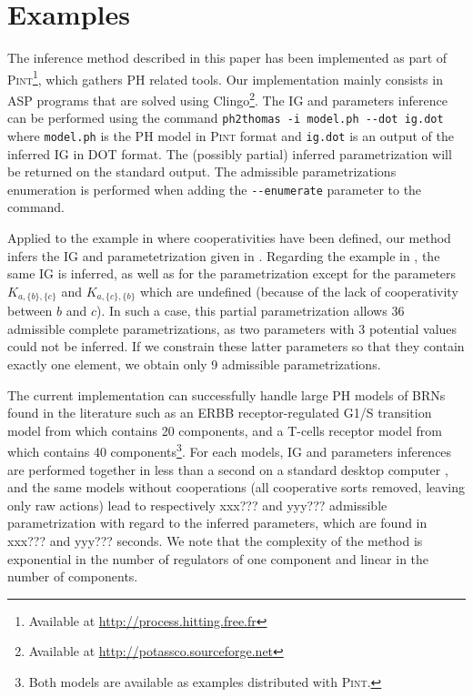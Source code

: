 \section{Examples}\label{sec:examples}

The inference method described in this paper has been implemented as part of
\textsc{Pint}\footnote{Available at \url{http://process.hitting.free.fr}}, which gathers PH related
tools.
Our implementation mainly consists in ASP programs that are solved using Clingo\footnote{Available
at \url{http://potassco.sourceforge.net}}.
The IG and parameters inference can be performed using the command
\texttt{ph2thomas -i model.ph -{}-dot ig.dot}
where \texttt{model.ph} is the PH model in \textsc{Pint} format and \texttt{ig.dot} is an output of the inferred IG in DOT format.
The (possibly partial) inferred parametrization will be returned on the standard output.
The admissible parametrizations enumeration is performed when adding the \texttt{-{}-enumerate}
parameter to the command.

Applied to the example in  where cooperativities have been defined,
our method infers the IG and parametetrization given in .
Regarding the example in , the same IG is inferred, as well as for the
parametrization except for the parameters $K_{a,\{b\},\{c\}}$ and $K_{a,\{c\},\{b\}}$ which are
undefined (because of the lack of cooperativity between $b$ and $c$).
In such a case, this partial parametrization allows 36 admissible complete parametrizations, as two
parameters with 3 potential values could not be inferred.
If we constrain these latter parameters so that they contain exactly one element, we obtain only 9
admissible parametrizations.

The current implementation can successfully handle large PH models of BRNs found in the literature
such as an ERBB receptor-regulated G1/S transition model from \cite{Sahin09} which contains 20
components, and a T-cells receptor model from \cite{Klamt06} which contains 40
components\footnote{Both models are available as examples distributed with \textsc{Pint}.}.
For each models, IG and parameters inferences are performed together in less than a second on a
standard desktop computer%
, and the same models without cooperations
(all cooperative sorts removed, leaving only raw actions) lead to
respectively xxx??? and yyy??? admissible parametrization with regard to the inferred parameters,
which are found in xxx??? and yyy??? seconds.
We note that the complexity of the method is exponential in the number of regulators of one
component and linear in the number of components.
